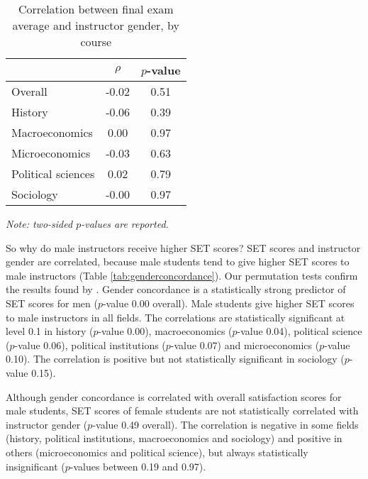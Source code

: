 \documentclass[12pt]{article}
\begin{document}
\begin{table}[htbp]
  \centering
  \footnotesize 
  \caption{Correlation between final exam average and instructor gender, by course}
    \begin{tabular}{lcc}
    \toprule 
                     & $\rho$  & $p$-value    \\
   \midrule
    Overall &            -0.02       & 0.51      \\
    History &            -0.06       & 0.39      \\
    Macroeconomics &      0.00       & 0.97      \\
    Microeconomics &     -0.03       & 0.63      \\
    Political sciences &  0.02       & 0.79      \\
    Sociology &          -0.00       & 0.97      \\
    \bottomrule
    \end{tabular}%
 \label{tab:genderfinal}%
 
  \textit{Note: two-sided $p$-values are reported.}
\end{table}%
\normalsize



So why do male instructors receive higher SET scores? 
SET scores and instructor gender are correlated, because male students tend to give higher SET scores to male instructors (Table \ref{tab:genderconcordance}). 
Our permutation tests confirm the results found by \citet{Boring2015}. 
Gender concordance is a statistically strong predictor of SET scores for men ($p$-value 0.00 overall). 
Male students give higher SET scores to male instructors in all fields. 
The correlations are statistically significant at level 0.1 in history ($p$-value 0.00), macroeconomics ($p$-value 0.04), political science ($p$-value 0.06), political institutions ($p$-value 0.07) and 
microeconomics ($p$-value 0.10). 
The correlation is positive but not statistically significant in sociology ($p$-value 0.15). 

Although gender concordance is correlated with overall satisfaction scores for male students, SET scores of female students are not statistically correlated with instructor gender ($p$-value 0.49 overall). The correlation is negative in some fields (history, political institutions, macroeconomics and sociology) and positive in others (microeconomics and political science), but always statistically insignificant ($p$-values between 0.19 and 0.97).
\end{document}
